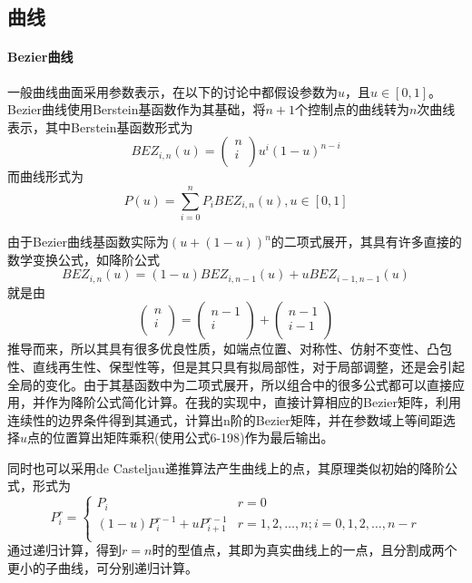 \documentclass[a4paper,UTF8]{article}
\theoremstyle{definition}
\begin{document}
\subsection{曲线}
\paragraph{Bezier曲线} 一般曲线曲面采用参数表示，在以下的讨论中都假设参数为$u$，且$u\in[0,1]$。Bezier曲线使用Berstein基函数作为其基础，将$n+1$个控制点的曲线转为$n$次曲线表示，其中Berstein基函数形式为
\begin{equation}
BEZ_{i,n}(u)=\left(
\begin{array}{c}
n \\
i \\
\end{array}
\right)u^i(1-u)^{n-i}
\end{equation}
而曲线形式为
\begin{equation}
P(u)=\sum_{i=0}^{n}P_iBEZ_{i,n}(u), u\in[0,1]
\end{equation}
\par 由于Bezier曲线基函数实际为$(u+(1-u))^n$的二项式展开，其具有许多直接的数学变换公式，如降阶公式\cite{graphTextBook}
\begin{equation}
BEZ_{i,n}(u)=(1-u)BEZ_{i,n-1}(u)+uBEZ_{i-1,n-1}(u)
\end{equation}
就是由
\begin{equation}
\left(
\begin{array}{c}
n \\
i \\
\end{array}
\right)=
\left(
\begin{array}{c}
n-1 \\
i \\
\end{array}
\right)+
\left(
\begin{array}{c}
n-1 \\
i-1 \\
\end{array}
\right)
\end{equation}
推导而来，所以其具有很多优良性质，如端点位置、对称性、仿射不变性、凸包性、直线再生性、保型性等，但是其只具有拟局部性，对于局部调整，还是会引起全局的变化。由于其基函数中为二项式展开，所以组合中的很多公式都可以直接应用，并作为降阶公式简化计算。在我的实现中，直接计算相应的Bezier矩阵，利用连续性的边界条件得到其通式，计算出n阶的Bezier矩阵，并在参数域上等间距选择$u$点的位置算出矩阵乘积(使用公式6-198\cite{graphTextBook})作为最后输出。
\par 同时也可以采用de Casteljau递推算法产生曲线上的点，其原理类似初始的降阶公式，形式为
\begin{equation}
P_i^{r}=\left\{
\begin{array}{ll}
P_i & r=0 \\
(1-u)P_i^{r-1}+uP_{i+1}^{r-1} & r=1,2,\ldots,n; i=0,1,2,\ldots,n-r \\
\end{array}
\right.
\end{equation}
通过递归计算，得到$r=n$时的型值点，其即为真实曲线上的一点，且分割成两个更小的子曲线，可分别递归计算。
\end{document}
